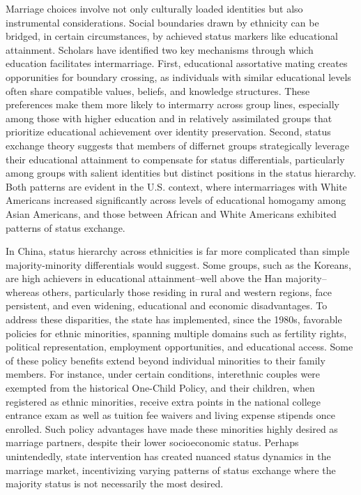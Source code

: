 Marriage choices involve not only culturally loaded identities but also
instrumental considerations.
Social boundaries drawn by ethnicity can be bridged, in certain circumstances,
by achieved status markers like educational attainment.
Scholars have identified two key mechanisms through which education facilitates
intermarriage.
First, educational assortative mating creates opporunities for boundary
crossing, as individuals with similar educational levels often share compatible
values, beliefs, and knowledge structures.
These preferences make them more likely to intermarry across group lines,
especially among those with higher education and in relatively assimilated
groups that prioritize educational achievement over identity preservation.
Second, status exchange theory suggests that members of differnet groups
strategically leverage their educational attainment to compensate for status
differentials, particularly among groups with salient identities but distinct
positions in the status hierarchy.
Both patterns are evident in the U.S. context, where intermarriages with
White Americans increased significantly across levels of educational homogamy
among Asian Americans, and those between African and White Americans exhibited
patterns of status exchange.

In China, status hierarchy across ethnicities is far more complicated than
simple majority-minority differentials  would suggest.
Some groups, such as the Koreans, are high achievers in educational
attainment--well above the Han majority--whereas others, particularly those
residing in rural and western regions, face persistent, and even widening,
educational and economic disadvantages.
To address these disparities, the state has implemented, since the 1980s,
favorable policies for ethnic minorities, spanning multiple domains such as
fertility rights, political representation, employment opportunities, and
educational access.
Some of these policy benefits extend beyond individual minorities to their
family members.
For instance, under certain conditions, interethnic couples were exempted from
the historical One-Child Policy, and their children, when registered as ethnic
minorities, receive extra points in the national college entrance exam as well
as tuition fee waivers and living expense stipends once enrolled.
Such policy advantages have made these minorities highly desired as marriage
partners, despite their lower socioeconomic status.
Perhaps unintendedly, state intervention has created nuanced status dynamics in
the marriage market, incentivizing varying patterns of status exchange where the
majority status is not necessarily the most desired.

